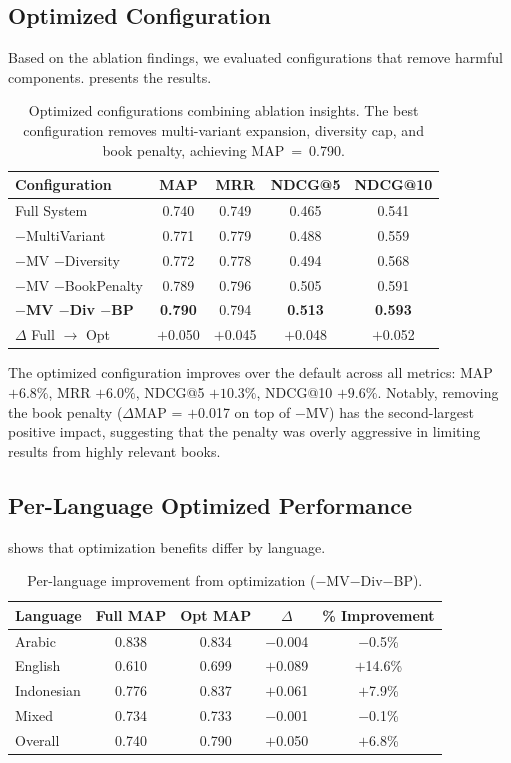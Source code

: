 \documentclass[preprint,12pt,numbers]{elsarticle}
\begin{document}
\subsection{Optimized Configuration}

Based on the ablation findings, we evaluated configurations that remove harmful components.  presents the results.

\begin{table}[t]
\centering
\caption{Optimized configurations combining ablation insights. The best configuration removes multi-variant expansion, diversity cap, and book penalty, achieving MAP~=~0.790.}
\label{tab:optimized}
\begin{tabular}{lcccc}
\toprule
Configuration & MAP & MRR & NDCG@5 & NDCG@10 \\
\midrule
Full System & 0.740 & 0.749 & 0.465 & 0.541 \\
$-$MultiVariant & 0.771 & 0.779 & 0.488 & 0.559 \\
$-$MV $-$Diversity & 0.772 & 0.778 & 0.494 & 0.568 \\
$-$MV $-$BookPenalty & 0.789 & 0.796 & 0.505 & 0.591 \\
\textbf{$-$MV $-$Div $-$BP} & \textbf{0.790} & 0.794 & \textbf{0.513} & \textbf{0.593} \\
\midrule
$\Delta$ Full $\rightarrow$ Opt & $+$0.050 & $+$0.045 & $+$0.048 & $+$0.052 \\
\bottomrule
\end{tabular}
\end{table}

The optimized configuration improves over the default across all metrics: MAP $+6.8\%$, MRR $+6.0\%$, NDCG@5 $+10.3\%$, NDCG@10 $+9.6\%$. Notably, removing the book penalty ($\Delta$MAP = $+$0.017 on top of $-$MV) has the second-largest positive impact, suggesting that the penalty was overly aggressive in limiting results from highly relevant books.

\subsection{Per-Language Optimized Performance}

 shows that optimization benefits differ by language.

\begin{table}[t]
\centering
\caption{Per-language improvement from optimization ($-$MV$-$Div$-$BP).}
\label{tab:optimized-lang}
\begin{tabular}{lcccc}
\toprule
Language & Full MAP & Opt MAP & $\Delta$ & \% Improvement \\
\midrule
Arabic & 0.838 & 0.834 & $-$0.004 & $-$0.5\% \\
English & 0.610 & 0.699 & $+$0.089 & $+$14.6\% \\
Indonesian & 0.776 & 0.837 & $+$0.061 & $+$7.9\% \\
Mixed & 0.734 & 0.733 & $-$0.001 & $-$0.1\% \\
\midrule
Overall & 0.740 & 0.790 & $+$0.050 & $+$6.8\% \\
\bottomrule
\end{tabular}
\end{table}
\end{document}
